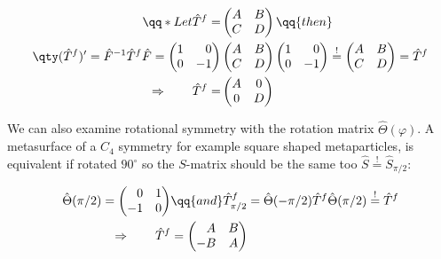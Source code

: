 \begin{equation}
\begin{aligned}
    \qq*{Let} \hat T^f =
    &\begin{pmatrix}
        A & B \\
        C & D
    \end{pmatrix}
    \qq{then} \\
    \qty(\hat T^f)' =
    \hat F^{-1} \hat T^f \hat F =
    \begin{pmatrix}
        1 & \phantom{-} 0 \\
        0 & -           1
    \end{pmatrix}
    &\begin{pmatrix}
        A & B \\
        C & D
    \end{pmatrix}
    \begin{pmatrix}
        1 & \phantom{-} 0 \\
        0 & -           1
    \end{pmatrix}
    \stackrel{!}{=}
    \begin{pmatrix}
        A & B \\
        C & D
    \end{pmatrix} =
    \hat T^f \\
    \Rightarrow \qquad
    \hat T^f =
    &\begin{pmatrix}
        A & 0 \\
        0 & D
    \end{pmatrix}
\end{aligned}
\end{equation}

We can also examine rotational symmetry with the rotation matrix $\hat \Theta(\varphi)$. A metasurface of a $C_4$ symmetry for example square shaped metaparticles, is equivalent if rotated $90^\circ$ so the $S$-matrix should be the same too
$\hat S \stackrel{!}{=} \hat S_{\pi/2}$:

\begin{equation}
\begin{aligned}
    \hat \Theta(\pi/2) =
    \begin{pmatrix}
        \phantom{-} 0 & 1 \\
        -1 & 0
    \end{pmatrix}
    &\qq{and}
    \hat T^f_{\pi/2} =
    \hat \Theta(-\pi/2) \hat T^f \hat \Theta(\pi/2)
    \stackrel{!}{=}
    \hat T^f\\
    \Rightarrow \qquad
    \hat T^f &=
    \begin{pmatrix}
        \phantom{-} A & B \\
        -           B & A
    \end{pmatrix}
\end{aligned}
\end{equation}


